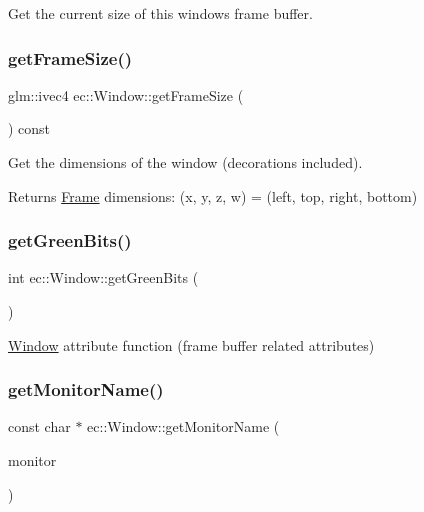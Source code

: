 Get the current size of this window\textquotesingle{}s frame buffer. \mbox{\label{classec_1_1_window_ab97322933ab8306533a1ab9b3e2fb57d}} 
\subsubsection{\texorpdfstring{get\+Frame\+Size()}{getFrameSize()}}
{\footnotesize\ttfamily glm\+::ivec4 ec\+::\+Window\+::get\+Frame\+Size (\begin{DoxyParamCaption}{ }\end{DoxyParamCaption}) const}

Get the dimensions of the window (decorations included). \begin{DoxyReturn}{Returns}
\mbox{\hyperlink{classec_1_1_frame}{Frame}} dimensions\+: (x, y, z, w) = (left, top, right, bottom) 
\end{DoxyReturn}
\mbox{\label{classec_1_1_window_a16e7202f6f304e998772d58a9207bdee}} 
\subsubsection{\texorpdfstring{get\+Green\+Bits()}{getGreenBits()}}
{\footnotesize\ttfamily int ec\+::\+Window\+::get\+Green\+Bits (\begin{DoxyParamCaption}{ }\end{DoxyParamCaption})\hspace{0.3cm}{\ttfamily [static]}}

\mbox{\hyperlink{classec_1_1_window}{Window}} attribute function (frame buffer related attributes) \mbox{\label{classec_1_1_window_ad382278721c5532b83962bcd5e405d17}} 
\subsubsection{\texorpdfstring{get\+Monitor\+Name()}{getMonitorName()}}
{\footnotesize\ttfamily const char $\ast$ ec\+::\+Window\+::get\+Monitor\+Name (\begin{DoxyParamCaption}\item[{G\+L\+F\+Wmonitor $\ast$}]{monitor }\end{DoxyParamCaption})\hspace{0.3cm}{\ttfamily [static]}}


